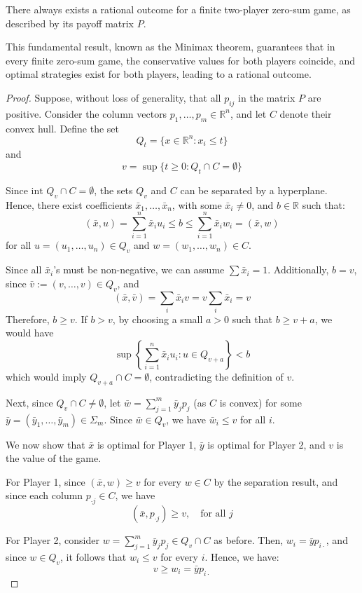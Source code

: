 \begin{theorem}
    There always exists a rational outcome for a finite two-player zero-sum game, as described by its payoff matrix $P$.
\end{theorem}
This fundamental result, known as the Minimax theorem, guarantees that in every finite zero-sum game, the conservative values for both players coincide, and optimal strategies exist for both players, leading to a rational outcome.
\begin{proof}
    Suppose, without loss of generality, that all $p_{ij}$ in the matrix $P$ are positive. 
    Consider the column vectors $p_1, \dots, p_m \in \mathbb{R}^n$, and let $C$ denote their convex hull. 
    Define the set
    \[Q_t = \{x \in \mathbb{R}^n : x_i \leq t \}\]
    and
    \[v = \sup \{t \geq 0 : Q_t \cap C = \emptyset \}\]
    
    Since $\text{int } Q_v \cap C = \emptyset$, the sets $Q_v$ and $C$ can be separated by a hyperplane. 
    Hence, there exist coefficients $\bar{x}_1, \dots, \bar{x}_n$, with some $\bar{x}_i \neq 0$, and $b \in \mathbb{R}$ such that:
    \[(\bar{x}, u) = \sum_{i=1}^{n} \bar{x}_i u_i \leq b \leq \sum_{i=1}^{n} \bar{x}_i w_i = (\bar{x}, w)\]
    for all $u = (u_1, \dots, u_n) \in Q_v$ and $w = (w_1, \dots, w_n) \in C$.
    
    Since all $\bar{x}_i$'s must be non-negative, we can assume $\sum \bar{x}_i = 1$. 
    Additionally, $b = v$, since $\bar{v} := (v, \dots, v) \in Q_v$, and
    \[(\bar{x}, \bar{v}) = \sum_i \bar{x}_i v = v \sum_i \bar{x}_i = v\]
    Therefore, $b \geq v$. If $b > v$, by choosing a small $a > 0$ such that $b \geq v + a$, we would have
    \[\sup \left\{\sum_{i=1}^{n} \bar{x}_i u_i : u \in Q_{v + a} \right\} < b\]
    which would imply $Q_{v + a} \cap C = \emptyset$, contradicting the definition of $v$.
    
    Next, since $Q_v \cap C \neq \emptyset$, let $\bar{w} = \sum_{j=1}^{m} \bar{y}_j p_j$ (as $C$ is convex) for some $\bar{y} = (\bar{y}_1, \dots, \bar{y}_m) \in \Sigma_m$. 
    Since $\bar{w} \in Q_v$, we have $\bar{w}_i \leq v$ for all $i$.
    
    We now show that $\bar{x}$ is optimal for Player 1, $\bar{y}$ is optimal for Player 2, and $v$ is the value of the game. 
    
    For Player 1, since $(\bar{x}, w) \geq v$ for every $w \in C$ by the separation result, and since each column $p_{\cdot j} \in C$, we have
    \[(\bar{x}, p_{\cdot j}) \geq v, \quad \text{for all } j\]
    
    For Player 2, consider $w = \sum_{j=1}^{m} \bar{y}_j p_j \in Q_v \cap C$ as before. 
    Then, $w_i = \bar{y} p_{i \cdot}$, and since $w \in Q_v$, it follows that $w_i \leq v$ for every $i$. Hence, we have:
    \[v \geq w_i = \bar{y} p_{i \cdot}\]
\end{proof}
